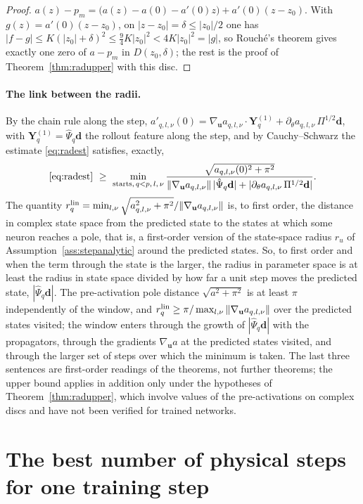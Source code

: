 \documentclass[11pt]{article}
\theoremstyle{definition}
\theoremstyle{remark}
\newcommand{\uu}{\mathbf{u}}
\newcommand{\Psih}{\hat\Psi}
\begin{document}
\begin{proof}
$a(z)-p_m=\big(a(z)-a(0)-a'(0)z\big)+a'(0)(z-z_0)$. With $g(z)=a'(0)(z-z_0)$, on $|z-z_0|=\delta\le|z_0|/2$ one has $|f-g|\le K(|z_0|+\delta)^2\le\tfrac94K|z_0|^2<4K|z_0|^2=|g|$, so Rouché's theorem gives exactly one zero of $a-p_m$ in $D(z_0,\delta)$; the rest is the proof of Theorem~\ref{thm:radupper} with this disc.
\end{proof}

\paragraph{The link between the radii.}
By the chain rule along the step, $a'_{q,l,\nu}(0)=\nabla_\uu a_{q,l,\nu}\cdot\mathbf Y^{(1)}_q+\partial_\theta a_{q,l,\nu}\,\Pi^{1/2}\mathbf d$, with $\mathbf Y^{(1)}_q=\Psih_q\mathbf d$ the rollout feature along the step, and by Cauchy--Schwarz the estimate \eqref{eq:radest} satisfies, exactly,
\[
\eqref{eq:radest}\ \ge\ \min_{\text{starts},\,q<p,\,l,\,\nu}\frac{\sqrt{a_{q,l,\nu}(0)^2+\pi^2}}{\|\nabla_\uu a_{q,l,\nu}\|\,|\Psih_q\mathbf d|+|\partial_\theta a_{q,l,\nu}\,\Pi^{1/2}\mathbf d|}.
\]
The quantity $r^{\rm lin}_{q}=\min_{l,\nu}\sqrt{a_{q,l,\nu}^2+\pi^2}/\|\nabla_\uu a_{q,l,\nu}\|$ is, to first order, the distance in complex state space from the predicted state to the states at which some neuron reaches a pole, that is, a first-order version of the state-space radius $r_u$ of Assumption~\ref{ass:stepanalytic} around the predicted states.
So, to first order and when the term through the state is the larger, the radius in parameter space is at least the radius in state space divided by how far a unit step moves the predicted state, $|\Psih_q\mathbf d|$.
The pre-activation pole distance $\sqrt{a^2+\pi^2}$ is at least $\pi$ independently of the window, and $r^{\rm lin}_q\ge\pi/\max_{l,\nu}\|\nabla_\uu a_{q,l,\nu}\|$ over the predicted states visited; the window enters through the growth of $|\Psih_q\mathbf d|$ with the propagators, through the gradients $\nabla_\uu a$ at the predicted states visited, and through the larger set of steps over which the minimum is taken.
The last three sentences are first-order readings of the theorems, not further theorems; the upper bound applies in addition only under the hypotheses of Theorem~\ref{thm:radupper}, which involve values of the pre-activations on complex discs and have not been verified for trained networks.

\section{The best number of physical steps for one training step}\label{sec:bestp}
\end{document}
